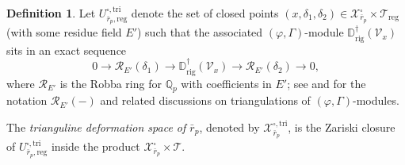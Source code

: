 \documentclass[12pt]{amsart}
\theoremstyle{definition}
\newtheorem{definition}[subsection]{Definition}
\numberwithin{equation}{subsection}
\def\calR{\mathcal{R}}
\def\calT{\mathcal{T}}
\def\calV{\mathcal{V}}
\def\calX{\mathcal{X}}
\def\DD{\mathbb{D}}
\def\QQ{\mathbb{Q}}
\newcommand{\rig}{\mathrm{rig}}
\newcommand{\tri}{\mathrm{tri}}
\newcommand{\reg}{\mathrm{reg}}
\begin{document}
\begin{definition}
\label{D:trianguline deformation space}
Let $U_{\bar r_p, \reg}^{\square, \tri}$ denote the set of closed points $(x,\delta_1, \delta_2) \in \calX_{\bar r_p}^\square \times \calT_\reg$ (with some residue field $E'$) such that  the associated $(\varphi, \Gamma)$-module $\DD_\rig^\dagger(\calV_x)$ sits in an exact sequence
\begin{equation}
\label{E:triangulation}
0 \to \calR_{E'}(\delta_1) \to \DD_\rig^\dagger(\calV_x) \to \calR_{E'}(\delta_2) \to 0,
\end{equation}
where $\calR_{E'}$ is the Robba ring for $\QQ_p$ with coefficients in $E'$; see \cite[\S\,6]{KPX} and \cite{liu} for the notation $\calR_{E'}(-)$ and related discussions on triangulations of $(\varphi, \Gamma)$-modules.

The \emph{trianguline deformation space of $\bar r_p$}, denoted by $\calX_{\bar r_p}^{\square, \tri}$, is the Zariski closure of $U_{\bar r_p, \reg}^{\square, \tri}$ inside the product $\calX_{\bar r_p}^\square \times \calT$.
\end{definition}
\end{document}
